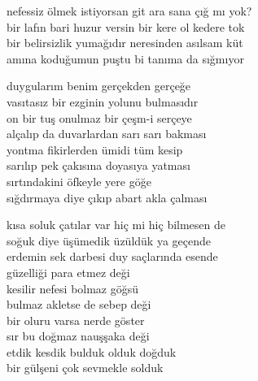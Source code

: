 \documentclass[10pt, openright, oneside]{memoir}
\theoremstyle{definition}
\begin{document}
\settowidth{\versewidth}{nefessiz ölmek istiyorsan git ara sana çığ mı yok?}
\begin{cverse}
  nefessiz ölmek istiyorsan git ara sana çığ mı yok? \\
  bir lafın bari huzur versin bir kere ol kedere tok \\
  bir belirsizlik yumağıdır neresinden asılsam küt \\
  amına koduğumun puştu bi tanıma da sığmıyor \\
\end{cverse}
\vspace*{\fill}
%
\newpage
{}
\vspace*{\fill}
\settowidth{\versewidth}{kısa soluk çatılar var hiç mi hiç bilmesen de}
\begin{cverse}
  duygularım benim gerçekden gerçeğe \\
  vasıtasız bir ezginin yolunu bulmasıdır \\
  on bir tuş onulmaz bir çeşm-i serçeye \\
  alçalıp da duvarlardan sarı sarı bakması \\
  yontma fikirlerden ümidi tüm kesip \\
  sarılıp pek çakısına doyasıya yatması \\
  sırtındakini öfkeyle yere göğe \\
  sığdırmaya diye çıkıp abart akla çalması

  kısa soluk çatılar var hiç mi hiç bilmesen de \\
  soğuk diye üşümedik üzüldük ya geçende \\
  erdemin sek darbesi duy saçlarında esende \\
  güzelliği para etmez deği \\
  kesilir nefesi bolmaz göğsü \\
  bulmaz akletse de sebep deği \\
  bir oluru varsa nerde göster \\
  sır bu doğmaz nauşşaka deği \\
  etdik kesdik bulduk olduk doğduk \\
  bir gülşeni çok sevmekle solduk \\
\end{cverse}
\vspace*{\fill}
%
\newpage
{}
\vspace*{\fill}
\end{document}

